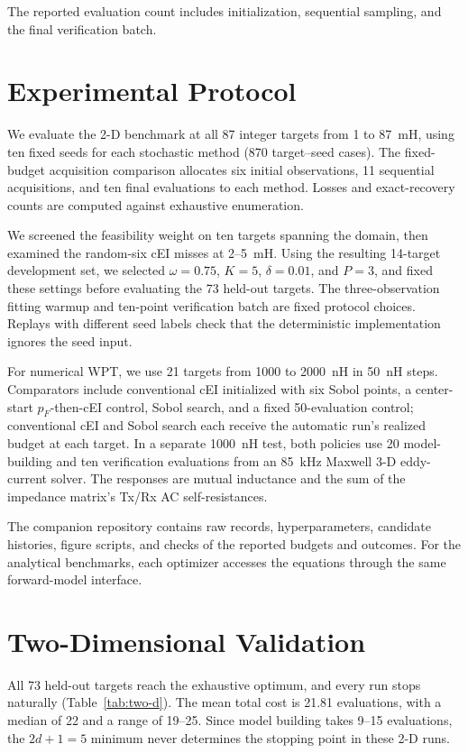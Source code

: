 \documentclass[10pt,conference,letterpaper]{IEEEtran}
\begin{document}
The reported evaluation count includes initialization, sequential sampling, and the final verification batch.

\section{Experimental Protocol}
We evaluate the 2-D benchmark at all 87 integer targets from 1 to 87~mH, using ten fixed seeds for each stochastic method (870 target--seed cases). The fixed-budget acquisition comparison allocates six initial observations, 11 sequential acquisitions, and ten final evaluations to each method. Losses and exact-recovery counts are computed against exhaustive enumeration.

We screened the feasibility weight on ten targets spanning the domain, then examined the random-six cEI misses at 2--5~mH. Using the resulting 14-target development set, we selected $\omega=0.75$, $K=5$, $\delta=0.01$, and $P=3$, and fixed these settings before evaluating the 73 held-out targets. The three-observation fitting warmup and ten-point verification batch are fixed protocol choices. Replays with different seed labels check that the deterministic implementation ignores the seed input.

For numerical WPT, we use 21 targets from 1000 to 2000~nH in 50~nH steps. Comparators include conventional cEI initialized with six Sobol points, a center-start $p_F$-then-cEI control, Sobol search, and a fixed 50-evaluation control; conventional cEI and Sobol search each receive the automatic run's realized budget at each target. In a separate 1000~nH test, both policies use 20 model-building and ten verification evaluations from an 85~kHz Maxwell 3-D eddy-current solver. The responses are mutual inductance and the sum of the impedance matrix's Tx/Rx AC self-resistances.

The companion repository contains raw records, hyperparameters, candidate histories, figure scripts, and checks of the reported budgets and outcomes. For the analytical benchmarks, each optimizer accesses the equations through the same forward-model interface.

\section{Two-Dimensional Validation}
All 73 held-out targets reach the exhaustive optimum, and every run stops naturally (Table~\ref{tab:two-d}). The mean total cost is 21.81 evaluations, with a median of 22 and a range of 19--25. Since model building takes 9--15 evaluations, the $2d+1=5$ minimum never determines the stopping point in these 2-D runs.
\end{document}
